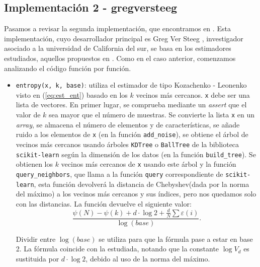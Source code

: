 \documentclass[12pt,a4paper]{report} %
\theoremstyle{definition}
\begin{document}
\subsection{Implementación 2 -  gregversteeg}

Pasamos a revisar la segunda implementación, que encontramos en \cite{npeet}. Esta implementación, cuyo desarrollador principal es Greg Ver Steeg \cite{gregv}, investigador asociado a la universidad de California del sur, se basa en los estimadores estudiados, aquellos propuestos en \cite{kraskov}. Como en el caso anterior, comenzamos analizando el código función por función. 
\begin{itemize}
\item \texttt{entropy(x, k, base)}: utiliza el estimador de tipo Kozachenko - Leonenko visto en (\ref{eq:est_ent}) basado en los $k$ vecinos más cercanos. \texttt{x} debe ser una lista de vectores. En primer lugar, se comprueba mediante un \textit{assert} que el valor de $k$ sea mayor que el número de muestras. Se convierte la lista \texttt{x} en un \textit{array}, se almacena el número de elementos y de características, se añade ruido a los elementos de \texttt{x} (en la función \texttt{add\_noise}), se obtiene el árbol de vecinos más cercanos usando árboles \texttt{KDTree} o \texttt{BallTree} de la biblioteca \texttt{scikit-learn} según la dimensión de los datos (en la función \texttt{build\_tree}). Se obtienen los $k$ vecinos más cercanos de \texttt{x} usando este árbol y la función \texttt{query\_neighbors}, que llama a la función \texttt{query} correspondiente de \texttt{scikit-learn}, esta función devolverá la distancia de Chebyshev(dada por la norma del máximo) a los vecinos más cercanos y sus índices, pero nos quedamos solo con las distancias. La función devuelve el siguiente valor:\[
  \frac{\psi(N) - \psi(k) + d \cdot \log 2 + \frac{d}{N}\sum \varepsilon(i)}{\log(base)}.
  \]

  Dividir entre $\log (base)$ se utiliza para que la fórmula pase a estar en base 2. La fórmula coincide con la estudiada, notando que la constante $\log V_d$ es sustituida por $d \cdot \log 2$, debido al uso de la norma del máximo.


\end{itemize}
\end{document}

